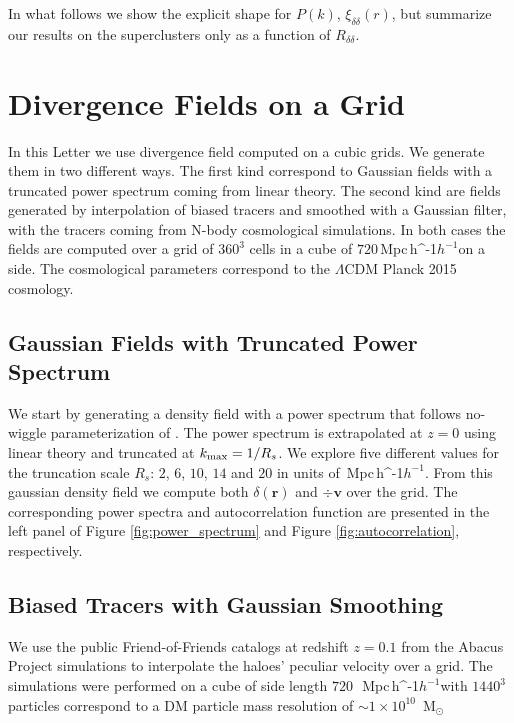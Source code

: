 \documentclass[usenatbib]{mnras}
\newcommand{\Msun}{\,{\rm M}$_{\odot}$\,}
\newcommand{\Mpch}{\,{\rm Mpc}\,\ifmmode h^{-1}\else $h^{-1}$\fi}
\begin{document}
In what follows we show the explicit shape for $P(k)$, $\xi_{\delta\delta}(r)$, but summarize our results on the superclusters only as a function of $R_{\delta\delta}$. 




\label{sec:numerical_setup}
\section{Divergence Fields on a Grid}
In this Letter we use divergence field computed on a cubic grids. 
We generate them in two different ways.
The first kind correspond to Gaussian fields with a truncated power spectrum coming from linear theory.
The second kind are fields generated by interpolation of biased tracers and smoothed with a Gaussian filter, with the tracers coming from N-body cosmological simulations.
In both cases the fields are computed over a grid of $360^3$ cells in a cube of $720$\Mpch on a side. 
The cosmological parameters correspond to the
$\Lambda$CDM Planck 2015 cosmology. 

\subsection{Gaussian Fields with Truncated Power Spectrum}

We start by generating a density field with a power spectrum that follows no-wiggle parameterization of \cite{1998ApJ...496..605E}.
The power spectrum is extrapolated at $z=0$ using linear theory and truncated at $k_{\rm max}=1/R_s$.
We explore five different values for the truncation scale $R_s$: $2$, $6$, $10$, $14$ and $20$ in units of \Mpch.
From this gaussian density field we compute both $\delta(\textbf{r})$ and $\div \textbf{v}$ over the grid.
The corresponding power spectra and autocorrelation function are presented in the left panel of Figure \ref{fig:power_spectrum}
 and Figure \ref{fig:autocorrelation}, respectively.
 
\subsection{Biased Tracers with Gaussian Smoothing}

We use the public Friend-of-Friends catalogs at redshift $z=0.1$
from the Abacus Project simulations to interpolate the haloes' peculiar velocity over a grid.
The simulations were performed on a cube of side length $720$\ \Mpch with
$1440^3$ particles correspond to a DM particle mass resolution
of $\sim 1 \times 10^{10}$ \Msun
\end{document}

